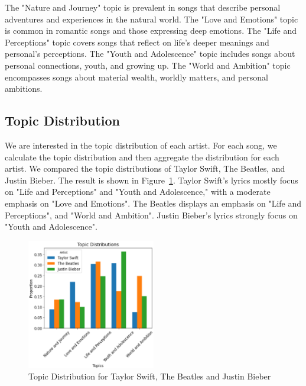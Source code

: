 \documentclass{article}
\begin{document}
\noindent The "Nature and Journey" topic is prevalent in songs that describe personal adventures and experiences in the natural world. The "Love and Emotions" topic is common in romantic songs and those expressing deep emotions. The "Life and Perceptions" topic covers songs that reflect on life's deeper meanings and personal's perceptions. The "Youth and Adolescence" topic includes songs about personal connections, youth, and growing up. The "World and Ambition" topic encompasses songs about material wealth, worldly matters, and personal ambitions.

\subsection{Topic Distribution}
We are interested in the topic distribution of each artist. For each song, we calculate the topic distribution and then aggregate the distribution for each artist. We compared the topic distributions of Taylor Swift, The Beatles, and Justin Bieber. The result is shown in Figure~\ref{artists}. Taylor Swift's lyrics mostly focus on "Life and Perceptions" and "Youth and Adolescence," with a moderate emphasis on "Love and Emotions". The Beatles displays an emphasis on "Life and Perceptions", and "World and Ambition". Justin Bieber’s lyrics strongly focus on "Youth and Adolescence".
\begin{figure}[H]
    \centering
    \includegraphics[width=0.5\textwidth]{artists.png}
    \caption{Topic Distribution for Taylor Swift, The Beatles and Justin Bieber}
\label{artists}
\end{figure}
\end{document}
